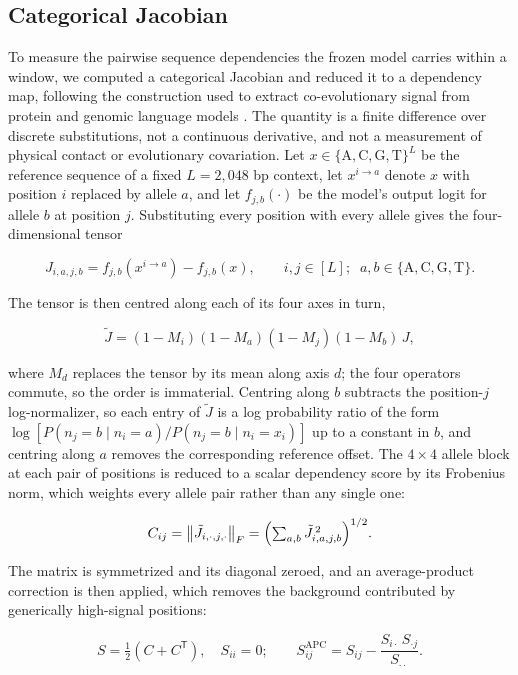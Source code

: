 \subsection*{Categorical Jacobian}

To measure the pairwise sequence dependencies the frozen model carries within
a window, we computed a categorical Jacobian and reduced it to a dependency
map, following the construction used to extract co-evolutionary signal from
protein and genomic language models \cite{zhang2024protein,cornman2025omg}.
The quantity is a finite difference over discrete substitutions, not a
continuous derivative, and not a measurement of physical contact or
evolutionary covariation. Let $x \in \{\mathrm{A,C,G,T}\}^{L}$ be the
reference sequence of a fixed $L = 2{,}048$ bp context, let $x^{i \to a}$
denote $x$ with position $i$ replaced by allele $a$, and let
$f_{j,b}(\cdot)$ be the model's output logit for allele $b$ at position $j$.
Substituting every position with every allele gives the four-dimensional
tensor

\[
J_{i,a,j,b} = f_{j,b}\!\left(x^{i \to a}\right) - f_{j,b}(x),
\qquad i,j \in [L];\;\; a,b \in \{\mathrm{A,C,G,T}\}.
\]

The tensor is then centred along each of its four axes in turn,

\[
\tilde{J} = (1 - M_i)(1 - M_a)(1 - M_j)(1 - M_b)\,J,
\]

where $M_d$ replaces the tensor by its mean along axis $d$; the four
operators commute, so the order is immaterial. Centring along $b$ subtracts
the position-$j$ log-normalizer, so each entry of $\tilde{J}$ is a log
probability ratio of the form
$\log\!\left[P(n_j = b \mid n_i = a) / P(n_j = b \mid n_i = x_i)\right]$ up to
a constant in $b$, and centring along $a$ removes the corresponding reference
offset. The $4 \times 4$ allele block at each pair of positions is reduced to
a scalar dependency score by its Frobenius norm, which weights every allele
pair rather than any single one:

\[
C_{ij} = \bigl\lVert \tilde{J}_{i,\cdot,j,\cdot} \bigr\rVert_F
= \Bigl(\textstyle\sum_{a,b} \tilde{J}^{\,2}_{i,a,j,b}\Bigr)^{1/2}.
\]

The matrix is symmetrized and its diagonal zeroed, and an average-product
correction is then applied, which removes the background contributed by
generically high-signal positions:

\[
S = \tfrac{1}{2}\!\left(C + C^{\mathsf{T}}\right), \quad S_{ii} = 0;
\qquad
S^{\mathrm{APC}}_{ij} = S_{ij} - \frac{S_{i\cdot}\,S_{\cdot j}}{S_{\cdot\cdot}}.
\]

